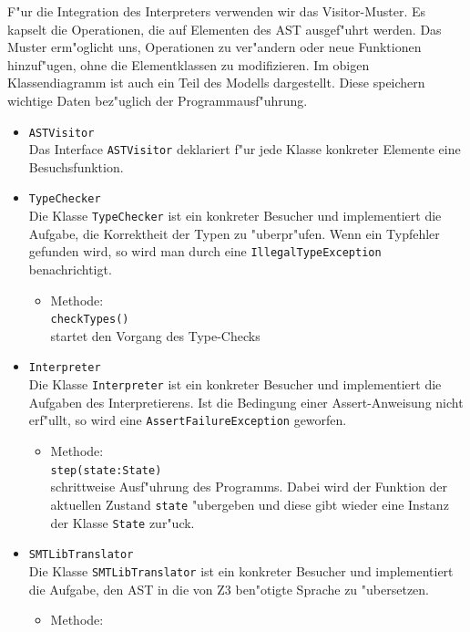 \documentclass[10pt,a4paper,titlepage]{article}
\begin{document}
F"ur die Integration des Interpreters verwenden wir das Visitor-Muster. Es kapselt die Operationen, die auf Elementen des AST ausgef"uhrt werden. Das Muster erm"oglicht uns, Operationen zu ver"andern oder neue Funktionen hinzuf"ugen, ohne die Elementklassen zu modifizieren. Im obigen Klassendiagramm ist auch ein Teil des Modells dargestellt. Diese speichern wichtige Daten bez"uglich der Programmausf"uhrung. 
\begin{itemize}
\item \texttt{ASTVisitor} \\
Das Interface \texttt{ASTVisitor} deklariert f"ur jede Klasse konkreter Elemente eine Besuchsfunktion.
\item \texttt{TypeChecker} \\
Die Klasse \texttt{TypeChecker} ist ein konkreter Besucher und implementiert die Aufgabe, die Korrektheit der Typen zu "uberpr"ufen. Wenn ein Typfehler gefunden wird, so wird man durch eine \texttt{IllegalTypeException} benachrichtigt. 
\begin{itemize}
\item Methode: \\
\texttt{checkTypes()} \\
startet den Vorgang des Type-Checks 
\end{itemize}
\item \texttt{Interpreter} \\
Die Klasse \texttt{Interpreter} ist ein konkreter Besucher und implementiert die Aufgaben des Interpretierens. Ist die Bedingung einer Assert-Anweisung nicht erf"ullt, so wird eine \texttt{AssertFailureException} geworfen.
\begin{itemize}
\item Methode: \\
\texttt{step(state:State)} \\
schrittweise Ausf"uhrung des Programms. Dabei wird der Funktion der aktuellen Zustand \texttt{state} "ubergeben und diese gibt wieder eine Instanz der Klasse \texttt{State} zur"uck. 
\end{itemize}
\item \texttt{SMTLibTranslator} \\
Die Klasse \texttt{SMTLibTranslator} ist ein konkreter Besucher und implementiert die Aufgabe, den AST in die von Z3 ben"otigte Sprache zu "ubersetzen.
\begin{itemize}
\item Methode: \\

\end{itemize}
\end{itemize}
\end{document}
